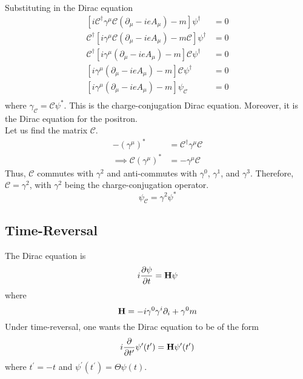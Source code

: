 \documentclass[12pt,a4paper,titlepage]{article}
\begin{document}
Substituting in the Dirac equation
\begin{equation}
\begin{aligned}
[i\mathcal{C}^{\dagger}\gamma^{\mu}\mathcal{C}(\partial_{\mu}-ieA_{\mu})-m]\psi^{\dagger}&=0\\
\mathcal{C}^{\dagger}[i\gamma^{\mu}\mathcal{C}(\partial_{\mu}-ieA_{\mu})-m\mathcal{C}]\psi^{\dagger}&=0\\
\mathcal{C}^{\dagger}[i\gamma^{\mu}(\partial_{\mu}-ieA_{\mu})-m]\mathcal{C}\psi^{\dagger}&=0\\
[i\gamma^{\mu}(\partial_{\mu}-ieA_{\mu})-m]\mathcal{C}\psi^{\dagger}&=0\\
[i\gamma^{\mu}(\partial_{\mu}-ieA_{\mu})-m]\psi_{\mathcal{C}}&=0\\
\end{aligned}
\end{equation}
where $\gamma_{\mathcal{C}}=\mathcal{C}\psi^{*}$. This is the charge-conjugation Dirac equation. Moreover, it is the Dirac equation for the positron.\\

Let us find the matrix $\mathcal{C}$.
\begin{equation}
\begin{aligned}
-(\gamma^{\mu})^{*}&=\mathcal{C}^{\dagger}\gamma^{\mu}\mathcal{C}\\
\implies \mathcal{C}(\gamma^{\mu})^{*}&=-\gamma^{\mu}\mathcal{C}
\end{aligned}
\end{equation}
Thus, $\mathcal{C}$ commutes with $\gamma^{2}$ and anti-commutes with $\gamma^{0}$, $\gamma^{1}$, and $\gamma^{3}$. Therefore, $\mathcal{C}=\gamma^{2}$, with $\gamma^{2}$ being the charge-conjugation operator.
\begin{equation}
\psi_{\mathcal{C}}=\gamma^{2}\psi^{*}
\end{equation}

\subsection{Time-Reversal}
The Dirac equation is
\begin{equation}
i\pdv{\psi}{t}=\vb{H}\psi
\end{equation}
where 
\begin{equation}
\vb{H}=-i\gamma^{0}\gamma^{i}\partial_{i}+\gamma^{0}m
\end{equation}
Under time-reversal, one wants the Dirac equation to be of the form
\begin{equation}
i\pdv{t^{\prime}}\psi^{\prime}(t^{\prime})=\vb{H}\psi^{\prime}(t^{\prime})
\end{equation}
where $t^{\prime}=-t$ and $\psi^{\prime}(t^{\prime})=\Theta\psi(t)$.\\
\end{document}
